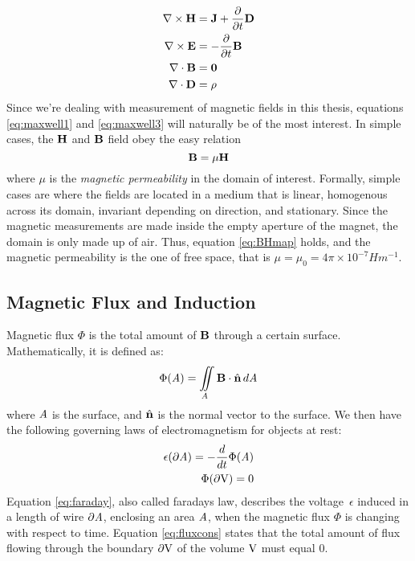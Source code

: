 \begin{align}
    \nabla \times \vb{H} & = \vb{J} + \frac{\partial}{\partial t}\vb{D}
    \label{eq:maxwell1}                                                    \\
    \nabla \times \vb{E} & = -\frac{\partial}{\partial t}\vb{B}
    \label{eq:maxwell2}                                                    \\
    \nabla \cdot \vb{B}        & = \vb{0}
    \label{eq:maxwell3}                                                    \\
    \nabla \cdot \vb{D}        & = \rho
    \label{:eqmaxwell4}
\end{align}
Since we're dealing with measurement of magnetic fields in this thesis,
equations \ref{eq:maxwell1} and \ref{eq:maxwell3} will naturally be of
the most interest. In simple cases, the $\vb{H}$ and $\vb{B}$ field
obey the easy relation 
\begin{equation}
    \vb{B} = \mu \vb{H}
    \label{eq:BHmap}
\end{equation}
where $\mu$ is the \emph{magnetic permeability} in the domain of interest.
Formally, simple cases are where the fields are located in a medium that is
linear, homogenous across its domain, invariant depending on direction, and
stationary. Since the magnetic measurements are made inside the empty aperture
of the magnet, the domain is only made up of air. Thus, equation \ref{eq:BHmap}
holds, and the magnetic permeability is the one of free space, that is
$\mu = \mu_0 = 4\pi \times 10^{-7} Hm^{-1}$. \cite[Ch.4.1-4.4]{russenschuck2011field}


\subsection{Magnetic Flux and Induction}
Magnetic flux $\Phi$ is the total amount of $\vb{B}$ through a certain surface.
Mathematically, it is defined as:
\begin{equation}
    \Phi(\mathit{A}) = \iint\limits_{\mathit{A}} \vb{B} \cdot \hat{\vb{n}}\, d\mathit{A}
\end{equation}
where $\mathit{A}$ is the surface, and $\hat{\vb{n}}$ is the normal vector to the surface.
We then have the following governing laws of electromagnetism for objects at rest:
\begin{align}
    \epsilon(\partial\mathit{A}) = -\frac{d}{dt}\Phi(\mathit{A})
    \label{eq:faraday}\\
    \Phi(\partial\mathrm{V}) = 0
    \label{eq:fluxcons}
\end{align}
Equation \ref{eq:faraday}, also called faradays law, describes the voltage\
$\epsilon$ induced in a length of wire $\partial\mathit{A}$, enclosing an area
$\mathit{A}$, when the magnetic flux $\Phi$ is changing with respect to time.
Equation \ref{eq:fluxcons} states that the total amount of flux flowing
through the boundary $\partial\mathrm{V}$ of the volume
$\mathrm{V}$ must equal 0. \cite[Ch.4.1.1]{russenschuck2011field}

